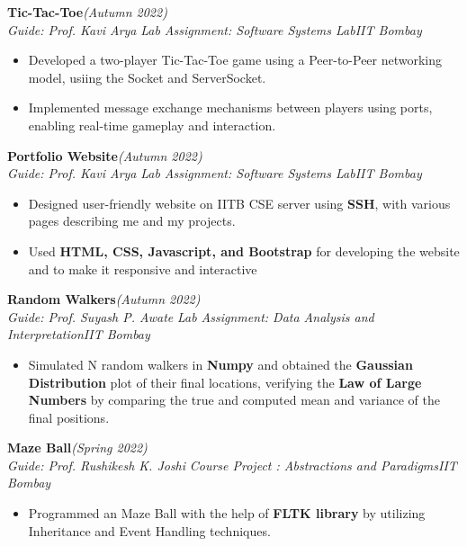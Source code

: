 \documentclass[10 pt]{article}
\begin{document}
	{\selectfont
		\textbf{{Tic-Tac-Toe}}\hfill{\sl \small (Autumn 2022)}\\
	}{\it Guide: Prof. Kavi Arya \textbar} {\it Lab Assignment: Software Systems Lab}\hfill{\sl \small IIT Bombay}\\
	\begin{itemize}[itemsep = -0.8 mm, leftmargin=*]
		\vspace{-16pt}
		\item Developed a two-player Tic-Tac-Toe game using a Peer-to-Peer networking model, usiing the Socket and ServerSocket.
\item Implemented message exchange mechanisms between players using ports, enabling real-time gameplay and interaction.
\end{itemize}
	{\selectfont
		\textbf{{Portfolio Website}}\hfill{\sl \small (Autumn 2022)}\\
	}{\it Guide: Prof. Kavi Arya \textbar} {\it Lab Assignment: Software Systems Lab}\hfill{\sl \small IIT Bombay}\\
	\begin{itemize}[itemsep = -0.8 mm, leftmargin=*]
		\vspace{-16pt}
		\item Designed user-friendly website on IITB CSE server using \textbf{SSH}, with various pages describing me and my projects.
		\item Used \textbf{HTML, CSS, Javascript, and Bootstrap} for developing the website and to make it responsive and interactive
	\end{itemize}
	{\selectfont
		\textbf{{Random Walkers}}\hfill{\sl \small (Autumn 2022)}\\
	}{\it Guide: Prof. Suyash P. Awate \textbar} {\it Lab Assignment: Data Analysis and Interpretation}\hfill{\sl \small IIT Bombay}\\
	\begin{itemize}[itemsep = -0.8 mm, leftmargin=*]
		\vspace{-16pt}
		\item Simulated N random walkers in \textbf{Numpy} and obtained the \textbf{Gaussian Distribution} plot of their final locations, verifying the \textbf{Law of Large Numbers} by comparing the true and computed mean and variance of the final positions.
	\end{itemize}
	{\selectfont
		\textbf{{Maze Ball}}\hfill{\sl \small (Spring 2022)}\\
	}{\it Guide: Prof. Rushikesh K. Joshi \textbar} {\it Course Project : Abstractions and Paradigms}\hfill{\sl \small IIT Bombay}\\
	\begin{itemize}[itemsep = -0.8 mm, leftmargin=*]
		\vspace{-16pt}
		\item Programmed an Maze Ball with the help of \textbf{FLTK library} by utilizing Inheritance and Event Handling techniques.
	\end{itemize}
\vspace{\baselineskip}
\vspace{-13pt}
\end{document}
